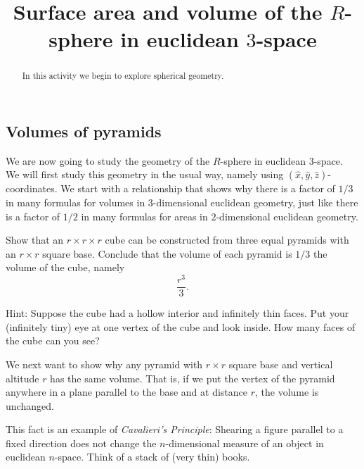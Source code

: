 \documentclass{ximera}
\title{Surface area and volume of the $R$-sphere in euclidean $3$-space}
\begin{document}
\begin{abstract}
In this activity we begin to explore spherical geometry.
\end{abstract}
\maketitle

\subsection*{Volumes of pyramids}

We are now going to study the geometry of the $R$-sphere in euclidean
$3$-space. We will first study this geometry in the usual way, namely
using $\left( \hat{x},\hat{y},\hat{z}\right) $-coordinates. We start
with a relationship that shows why there is a factor of $1/3$ in many
formulas for volumes in $3$-dimensional euclidean geometry, just like
there is a factor of $1/2$ in many formulas for areas in
$2$-dimensional euclidean geometry.

\begin{exercise} Show that an $r\times r\times r$ cube can be constructed
from three equal pyramids with an $r\times r$ square base. Conclude
that the volume of each pyramid is $1/3$ the volume of the cube,
namely
\[
\frac{r^{3}}{3}.
\]


Hint: Suppose the cube had a hollow interior and infinitely thin
faces. Put your (infinitely tiny) eye at one vertex of the cube and
look inside. How many faces of the cube can you see?
\end{exercise}

We next want to show why any pyramid with $r\times r$ square base and
vertical altitude $r$ has the same volume. That is, if we put the
vertex of the pyramid anywhere in a plane parallel to the base and at
distance $r$, the volume is unchanged.

This fact is an example of \textit{Cavalieri's Principle}: Shearing a
figure parallel to a fixed direction does not change the
$n$-dimensional measure of an object in euclidean $n$-space. Think of
a stack of (very thin) books.
\end{document}
